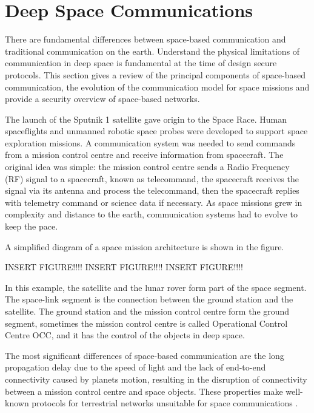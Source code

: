 \section{Deep Space Communications}

There are fundamental differences between space-based communication and traditional communication on the earth. Understand the physical limitations of communication in deep space is fundamental at the time of design secure protocols. This section gives a review of the principal components of space-based communication, the evolution of the communication model for space missions and provide a security overview of space-based networks.

The launch of the Sputnik 1 satellite gave origin to the Space Race. Human spaceflights and unmanned robotic space probes were developed to support space exploration missions. A communication system was needed to send commands from a mission control centre and receive information from spacecraft. The original idea was simple: the mission control centre sends a Radio Frequency (RF) signal to a spacecraft, known as telecommand, the spacecraft receives the signal via its antenna and process the telecommand, then the spacecraft replies with telemetry command or science data if necessary. As space missions grew in complexity and distance to the earth, communication systems had to evolve to keep the pace. 

A simplified diagram of a space mission architecture is shown in the figure. 

INSERT FIGURE!!!!
INSERT FIGURE!!!!
INSERT FIGURE!!!!

In this example, the satellite and the lunar rover form part of the space segment. The space-link segment is the connection between the ground station and the satellite.  The ground station and the mission control centre form the ground segment, sometimes the mission control centre is called Operational Control Centre OCC, and it has the control of the objects in deep space.

 The most significant differences of space-based communication are the long propagation delay due to the speed of light and the lack of end-to-end connectivity caused by planets motion, resulting in the disruption of connectivity between a mission control centre and space objects. These properties make well-known protocols for terrestrial networks unsuitable for space communications \cite{fall2003delay}.


